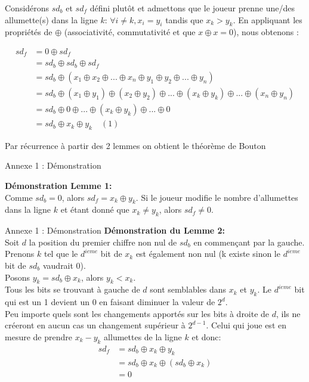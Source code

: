 \documentclass[ aspectratio=169]{beamer}
\begin{document}
\begin{frame}

Considérons $sd_{b}$ et $sd_{f}$ défini plutôt et admettons que le joueur prenne une/des allumette(s) dans la ligne $k$: $\forall i \neq k, x_{i} = y_{i}$ tandis que $x_{k} > y_{k}$. En appliquant les propriétés de $\oplus$ (associativité, commutativité et que $x \oplus x = 0$), nous obtenons :

\begin{align*}
sd_{f} &= 0 \oplus sd_{f} \\
&= sd_{b} \oplus sd_{b} \oplus sd_{f} \\
&= sd_{b} \oplus (x_{1} \oplus x_{2} \oplus ... \oplus x_{n} \oplus y_{1} \oplus y_{2} \oplus ... \oplus y_{n}) \\
&= sd_{b} \oplus (x_{1} \oplus y_{1}) \oplus (x_{2} \oplus y_{2}) \oplus ... \oplus (x_{k} \oplus y_{k}) \oplus ... \oplus (x_{n} \oplus y_{n}) \\
&= sd_{b} \oplus 0\oplus ...\oplus (x_{k} \oplus y_{k})\oplus ...\oplus 0 \\
&= sd_{b} \oplus x_{k} \oplus y_{k} \quad (1)
\end{align*}

Par récurrence à partir des 2 lemmes on obtient le théorème de Bouton

\end{frame}

\begin{frame}{Annexe 1 : Démonstration}

\textbf{Démonstration Lemme 1:} \\
Comme $sd_{b}=0$, alors $sd_{f}=x_{k} \oplus y_{k}$. Si le joueur modifie le nombre d'allumettes dans la ligne $k$ et étant donné que $x_{k} \neq y_{k}$, alors $sd_{f} \neq 0.$\\
\end{frame}

\begin{frame}{Annexe 1 : Démonstration}
\textbf{Démonstration du Lemme 2:} \\
Soit $d$ la position du premier chiffre non nul de $sd_{b}$ en commençant par la gauche. Prenons $k$ tel que le $d^{ieme}$ bit de $x_{k}$ est également non nul (k existe sinon le $d^{ieme}$ bit de $sd_{b}$ vaudrait 0).\\
Posons $y_{k}=sd_{b} \oplus x_{k}$, alors $y_{k}<x_{k}$.\\
Tous les bits se trouvant à gauche de $d$ sont semblables dans $x_{k}$ et $y_{k}$. Le $d^{ieme}$ bit qui est un 1 devient un 0 en faisant diminuer la valeur de $2^{d}$.\\
Peu importe quels sont les changements apportés sur les bits à droite de $d$, ils ne créeront en aucun cas un changement supérieur à $2^{d-1}$. Celui qui joue est en mesure de prendre $x_{k}-y_{k}$ allumettes de la ligne $k$ et donc:
\begin{align*}
sd_{f} &= sd_{b} \oplus x_{k} \oplus y_{k} \\
&= sd_{b} \oplus x_{k} \oplus (sd_{b} \oplus x_{k}) \\
&= 0
\end{align*}

\end{frame}
\end{document}
